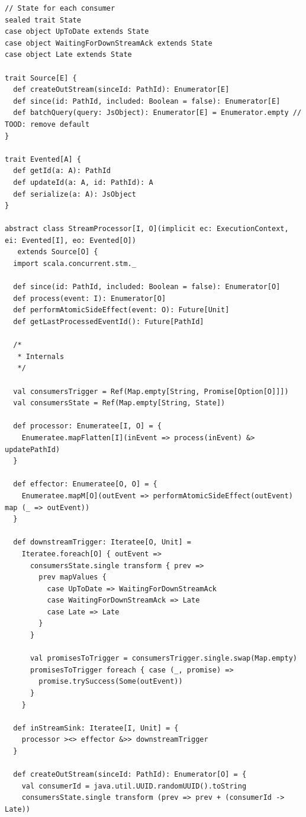 \begin{verbatim}
// State for each consumer
sealed trait State
case object UpToDate extends State
case object WaitingForDownStreamAck extends State
case object Late extends State

trait Source[E] {
  def createOutStream(sinceId: PathId): Enumerator[E]
  def since(id: PathId, included: Boolean = false): Enumerator[E]
  def batchQuery(query: JsObject): Enumerator[E] = Enumerator.empty // TOOD: remove default
}

trait Evented[A] {
  def getId(a: A): PathId
  def updateId(a: A, id: PathId): A
  def serialize(a: A): JsObject
}

abstract class StreamProcessor[I, O](implicit ec: ExecutionContext, ei: Evented[I], eo: Evented[O])
   extends Source[O] {
  import scala.concurrent.stm._
  
  def since(id: PathId, included: Boolean = false): Enumerator[O]
  def process(event: I): Enumerator[O]
  def performAtomicSideEffect(event: O): Future[Unit]
  def getLastProcessedEventId(): Future[PathId]
  
  /*
   * Internals
   */

  val consumersTrigger = Ref(Map.empty[String, Promise[Option[O]]])
  val consumersState = Ref(Map.empty[String, State])

  def processor: Enumeratee[I, O] = {
    Enumeratee.mapFlatten[I](inEvent => process(inEvent) &> updatePathId)
  }

  def effector: Enumeratee[O, O] = {
    Enumeratee.mapM[O](outEvent => performAtomicSideEffect(outEvent) map (_ => outEvent))
  }

  def downstreamTrigger: Iteratee[O, Unit] =
    Iteratee.foreach[O] { outEvent =>
      consumersState.single transform { prev =>
        prev mapValues {
          case UpToDate => WaitingForDownStreamAck
          case WaitingForDownStreamAck => Late
          case Late => Late
        }
      }

      val promisesToTrigger = consumersTrigger.single.swap(Map.empty)
      promisesToTrigger foreach { case (_, promise) =>
        promise.trySuccess(Some(outEvent))
      }
    }

  def inStreamSink: Iteratee[I, Unit] = {
    processor ><> effector &>> downstreamTrigger
  }

  def createOutStream(sinceId: PathId): Enumerator[O] = {
    val consumerId = java.util.UUID.randomUUID().toString
    consumersState.single transform (prev => prev + (consumerId -> Late))


\end{verbatim}
